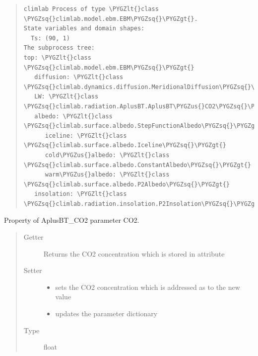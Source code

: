 \documentclass[a4paper,10pt,english]{sphinxmanual}
\def\PYGZus{\char`\_}
\def\PYGZlt{\char`\<}
\def\PYGZgt{\char`\>}
\def\PYGZsq{\char`\'}
\renewcommand\PYGZsq{\textquotesingle}
\begin{document}
\begin{fulllineitems}
\begin{quote}
\begin{description}
\begin{Verbatim}[commandchars=\\\{\}]
climlab Process of type \PYGZlt{}class \PYGZsq{}climlab.model.ebm.EBM\PYGZsq{}\PYGZgt{}. 
State variables and domain shapes: 
  Ts: (90, 1) 
The subprocess tree: 
top: \PYGZlt{}class \PYGZsq{}climlab.model.ebm.EBM\PYGZsq{}\PYGZgt{}
   diffusion: \PYGZlt{}class \PYGZsq{}climlab.dynamics.diffusion.MeridionalDiffusion\PYGZsq{}\PYGZgt{}
   LW: \PYGZlt{}class \PYGZsq{}climlab.radiation.AplusBT.AplusBT\PYGZus{}CO2\PYGZsq{}\PYGZgt{}
   albedo: \PYGZlt{}class \PYGZsq{}climlab.surface.albedo.StepFunctionAlbedo\PYGZsq{}\PYGZgt{}
      iceline: \PYGZlt{}class \PYGZsq{}climlab.surface.albedo.Iceline\PYGZsq{}\PYGZgt{}
      cold\PYGZus{}albedo: \PYGZlt{}class \PYGZsq{}climlab.surface.albedo.ConstantAlbedo\PYGZsq{}\PYGZgt{}
      warm\PYGZus{}albedo: \PYGZlt{}class \PYGZsq{}climlab.surface.albedo.P2Albedo\PYGZsq{}\PYGZgt{}
   insolation: \PYGZlt{}class \PYGZsq{}climlab.radiation.insolation.P2Insolation\PYGZsq{}\PYGZgt{}
\end{Verbatim}

\end{description}\end{quote}

\begin{fulllineitems}
\label{api/climlab.radiation:climlab.radiation.AplusBT.AplusBT_CO2.CO2}
Property of AplusBT\_CO2 parameter CO2.
\begin{quote}\begin{description}
\item[{Getter}] \leavevmode
Returns the CO2 concentration which is stored in attribute 

\item[{Setter}] \leavevmode\begin{itemize}
\item {} 
sets the CO2 concentration which is addressed as 
to the new value

\item {} 
updates the parameter dictionary 

\end{itemize}

\item[{Type}] \leavevmode
float

\end{description}\end{quote}

\end{fulllineitems}


\end{fulllineitems}
\end{document}
